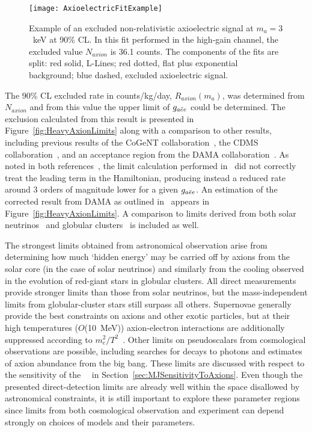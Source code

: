 		\begin{figure}
			\centering
			\texttt{[image: AxioelectricFitExample]}
			\caption[Example of an 90\% CL excluded non-relativistic axioelectric signal at $m_{a}=3$~keV]
			{Example of an excluded non-relativistic axioelectric signal at $m_{a}=3$~keV at 
			90\% CL.  In this fit performed in the high-gain channel, the excluded value $N_{axion}$ 
			is 36.1 counts.  
			The components of the fits are split: red solid, L-Lines; red dotted, flat plus exponential
			background; blue dashed, excluded axioelectric signal.}
			\label{fig:ExampleHeavyAxionFit}
		\end{figure}
			
	The 90\% CL excluded rate in counts/kg/day, $R_{axion}(m_{a})$, was
determined from $N_{axion}$ and from this value the upper limit of $g_{a\bar{e}e}$ could
be determined.  The exclusion calculated from this result is presented in
Figure~\ref{fig:HeavyAxionLimits} along with a comparison to other results,
including previous results of the CoGeNT collaboration~\cite{Aalseth:2008aa},
the CDMS collaboration~\cite{Ahmed2009}, and an acceptance region from the DAMA
collaboration~\cite{Bernabei:2005ca}.  As noted in both
references~\cite{Collar:2009sp,Pospelov:2008jk}, the limit calculation
performed in~\cite{Bernabei:2005ca} did not correctly treat the leading term in
the Hamiltonian, producing instead a reduced rate around 3 orders of magnitude
lower for a given $g_{a\bar{e}e}$.  An estimation of the corrected result from DAMA as
outlined in~\cite{Collar:2009sp} appears in Figure~\ref{fig:HeavyAxionLimits}.
A comparison to limits derived from both solar neutrinos~\cite{Gondolo09} and
globular clusters~\cite{Raffelt95} is included as well.  

The strongest limits obtained from astronomical observation arise from
determining how much `hidden energy' may be carried off by axions from the
solar core (in the case of solar neutrinos) and similarly from the cooling
observed in the evolution of red-giant stars in globular clusters.  All direct
measurements provide stronger limits than those from solar neutrinos, but the
mass-independent limits from globular-cluster stars still surpass all others.
Supernovae generally provide the best constraints on axions and other exotic
particles, but at their high temperatures ($O$(10~MeV)) axion-electron
interactions are additionally suppressed according to
$m_{e}^{2}/T^{2}$~\cite{Pospelov:2008jk}.  Other limits on pseudoscalars from
cosmological observations are possible, including searches for decays to
photons and estimates of axion abundance from the big bang.  These limits are
discussed with respect to the sensitivity of the \MJ~\minmod~in
Section~\ref{sec:MJSensitivityToAxions}.  Even though the presented
direct-detection limits are already well within the space disallowed by
astronomical constraints, it is still important to explore these parameter
regions since limits from both cosmological observation and experiment can
depend strongly on choices of models and their parameters.
			
